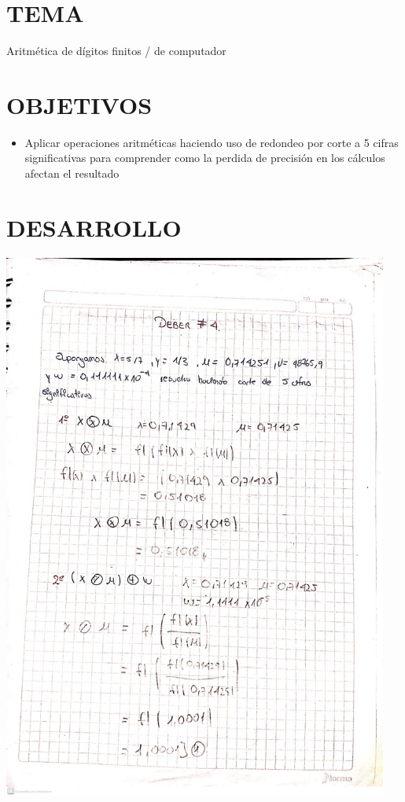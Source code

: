 \documentclass[12pt]{article}
\begin{document}
\section*{TEMA}
{Aritmética de dígitos finitos / de computador}

\vspace{0.5cm}

\section*{OBJETIVOS}
\begin{itemize}
    \item { Aplicar operaciones aritméticas haciendo uso de redondeo por corte a 5 cifras significativas para 
    comprender como la perdida de precisión en los cálculos afectan el resultado}
\end{itemize}

\vspace{0.5cm}

\section*{DESARROLLO}
\begin{minipage}{0.95\textwidth}
    \raggedleft
    \includegraphics[width=0.95\textwidth]{inFiles/Figures/ej1.jpeg}
\end{minipage}
\end{document}
